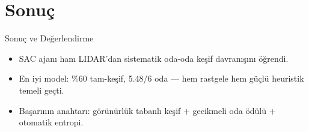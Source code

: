\documentclass[aspectratio=169,11pt]{beamer}
\begin{document}
\section{Sonuç}
\begin{frame}{Sonuç ve Değerlendirme}
  \begin{itemize}
    \item SAC ajanı ham LIDAR'dan \alert{sistematik oda-oda keşif} davranışını
    öğrendi.
    \item En iyi model: \%60 tam-keşif, 5.48/6 oda --- hem rastgele hem güçlü
    heuristik temeli geçti.
    \item Başarının anahtarı: görünürlük tabanlı keşif + gecikmeli oda ödülü +
    otomatik entropi.
  \end{itemize}
\end{frame}
\end{document}
